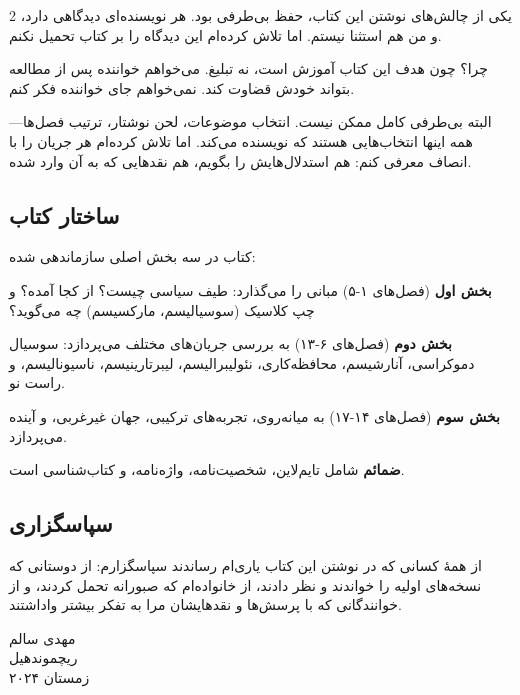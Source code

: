 \begin{multicols}{2}
یکی از چالش‌های نوشتن این کتاب، حفظ بی‌طرفی بود. هر نویسنده‌ای دیدگاهی دارد، و من هم استثنا نیستم. اما تلاش کرده‌ام این دیدگاه را بر کتاب تحمیل نکنم.

چرا؟ چون هدف این کتاب آموزش است، نه تبلیغ. می‌خواهم خواننده پس از مطالعه بتواند خودش قضاوت کند. نمی‌خواهم جای خواننده فکر کنم.

البته بی‌طرفی کامل ممکن نیست. انتخاب موضوعات، لحن نوشتار، ترتیب فصل‌ها—همه اینها انتخاب‌هایی هستند که نویسنده می‌کند. اما تلاش کرده‌ام هر جریان را با انصاف معرفی کنم: هم استدلال‌هایش را بگویم، هم نقدهایی که به آن وارد شده.

\subsection*{ساختار کتاب}

کتاب در سه بخش اصلی سازماندهی شده:

\textbf{بخش اول} (فصل‌های ۱-۵) مبانی را می‌گذارد: طیف سیاسی چیست؟ از کجا آمده؟ و چپ کلاسیک (سوسیالیسم، مارکسیسم) چه می‌گوید؟

\textbf{بخش دوم} (فصل‌های ۶-۱۳) به بررسی جریان‌های مختلف می‌پردازد: سوسیال دموکراسی، آنارشیسم، محافظه‌کاری، نئولیبرالیسم، لیبرتارینیسم، ناسیونالیسم، و راست نو.

\textbf{بخش سوم} (فصل‌های ۱۴-۱۷) به میانه‌روی، تجربه‌های ترکیبی، جهان غیرغربی، و آینده می‌پردازد.

\textbf{ضمائم} شامل تایم‌لاین، شخصیت‌نامه، واژه‌نامه، و کتاب‌شناسی است.

\subsection*{سپاسگزاری}

از همهٔ کسانی که در نوشتن این کتاب یاری‌ام رساندند سپاسگزارم: از دوستانی که نسخه‌های اولیه را خواندند و نظر دادند، از خانواده‌ام که صبورانه تحمل کردند، و از خوانندگانی که با پرسش‌ها و نقدهایشان مرا به تفکر بیشتر واداشتند.

\vspace{5mm}

\begin{flushright}
مهدی سالم\\
ریچموندهیل\\
زمستان ۲۰۲۴
\end{flushright}

\end{multicols}